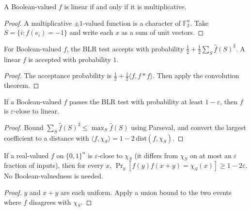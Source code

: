 \begin{theorem}
  \label{thm:analysis-linear-iff-multiplicative}
  \leanok
  A Boolean-valued $f$ is linear if and only if it is multiplicative.
\end{theorem}
\begin{proof}
  \leanok
  A multiplicative $\pm 1$-valued function is a character of $\mathbb{F}_2^n$.
  Take $S = \{i : f(e_i) = -1\}$ and write each $x$ as a sum of unit vectors.
\end{proof}

\begin{proposition}
  \label{prop:analysis-blr-accept}
  \leanok
  For Boolean-valued $f$, the BLR test accepts with probability
  $\frac{1}{2} + \frac{1}{2} \sum_S \widehat{f}(S)^3$. A linear $f$ is accepted with
  probability $1$.
\end{proposition}
\begin{proof}
  \leanok
  The acceptance probability is $\frac{1}{2} + \frac{1}{2} \langle f, f * f \rangle$.
  Then apply the convolution theorem.
\end{proof}

\begin{theorem}
  \label{thm:analysis-blr-soundness}
  \leanok
  If a Boolean-valued $f$ passes the BLR test with probability at least
  $1 - \varepsilon$, then $f$ is $\varepsilon$-close to linear.
\end{theorem}
\begin{proof}
  \leanok
  Bound $\sum_S \widehat{f}(S)^3 \le \max_S \widehat{f}(S)$ using Parseval, and
  convert the largest coefficient to a distance with
  $\langle f, \chi_S \rangle = 1 - 2\,\mathrm{dist}(f, \chi_S)$.
\end{proof}

\begin{proposition}
  \label{prop:analysis-local-correction}
  \leanok
  If a real-valued $f$ on $\{0,1\}^n$ is $\varepsilon$-close to $\chi_S$ (it
  differs from $\chi_S$ on at most an $\varepsilon$ fraction of inputs), then for
  every $x$, $\Pr_y[f(y) f(x + y) = \chi_S(x)] \ge 1 - 2\varepsilon$. No
  Boolean-valuedness is needed.
\end{proposition}
\begin{proof}
  \leanok
  $y$ and $x + y$ are each uniform. Apply a union bound to the two events where
  $f$ disagrees with $\chi_S$.
\end{proof}

